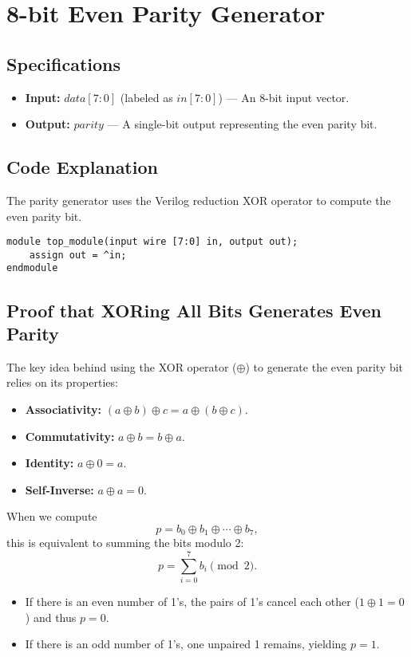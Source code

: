 \documentclass[11pt]{article}
\begin{document}
\section{8-bit Even Parity Generator}

\subsection{Specifications}
\begin{itemize}
    \item \textbf{Input:} \({data[7:0]}\) (labeled as \({in[7:0]}\)) --- An 8-bit input vector.
    \item \textbf{Output:} \({parity}\) --- A single-bit output representing the even parity bit.
\end{itemize}

\subsection{Code Explanation}
The parity generator uses the Verilog reduction XOR operator to compute the even parity bit.

\begin{lstlisting}[style=verilogstyle, caption={8-bit Even Parity Generator}]
module top_module(input wire [7:0] in, output out);
    assign out = ^in;
endmodule
\end{lstlisting}

\subsection{Proof that XORing All Bits Generates Even Parity}
The key idea behind using the XOR operator (\(\oplus\)) to generate the even parity bit relies on its properties:
\begin{itemize}
    \item \textbf{Associativity:} \((a \oplus b) \oplus c = a \oplus (b \oplus c)\).
    \item \textbf{Commutativity:} \(a \oplus b = b \oplus a\).
    \item \textbf{Identity:} \(a \oplus 0 = a\).
    \item \textbf{Self-Inverse:} \(a \oplus a = 0\).
\end{itemize}
When we compute
\[
p = b_0 \oplus b_1 \oplus \cdots \oplus b_7,
\]
this is equivalent to summing the bits modulo 2:
\[
p = \sum_{i=0}^{7} b_i \pmod{2}.
\]
\begin{itemize}
    \item If there is an even number of 1's, the pairs of 1's cancel each other (\(1 \oplus 1 = 0\)) and thus \(p = 0\).
    \item If there is an odd number of 1's, one unpaired 1 remains, yielding \(p = 1\).
\end{itemize}
\end{document}
